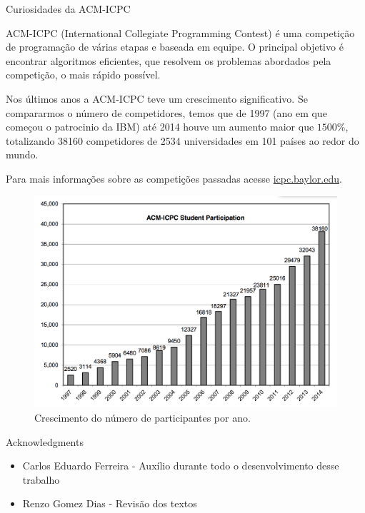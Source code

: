 \documentclass[final,hyperref={pdfpagelabels=false}]{beamer}
\begin{document}
\begin{frame}[t]
\begin{columns}[t]
\begin{column}{.465\textwidth}
\begin{block}{Curiosidades da ACM-ICPC}

ACM-ICPC (International Collegiate Programming Contest) é uma competição de programação
de várias etapas e baseada em equipe. O principal objetivo é encontrar algoritmos
eficientes, que resolvem os problemas abordados pela competição, o mais rápido
possível.


Nos últimos anos a ACM-ICPC teve um crescimento significativo. Se compararmos
o número de competidores, temos que de 1997 (ano em que começou o patrocinio
da IBM) até 2014 houve um aumento maior que $1500\%$, totalizando 38160
competidores de 2534 universidades em 101 países ao redor do mundo.

Para mais informa\c{c}\~oes sobre as competi\c{c}\~oes passadas acesse \href{icpc.baylor.edu}{icpc.baylor.edu}.
\newline
\begin{figure}%
    \includegraphics[width=0.8\linewidth]{grafico.png}
    \caption{Crescimento do n\'umero de participantes por ano.}
\end{figure}



\end{block}



\begin{block}{Acknowledgments}

\begin{itemize}
\item Carlos Eduardo Ferreira - Auxílio durante todo o desenvolvimento desse trabalho
\item Renzo Gomez Dias - Revisão dos textos
\end{itemize}


\end{block}
\end{column}
\end{columns}
\end{frame}
\end{document}
